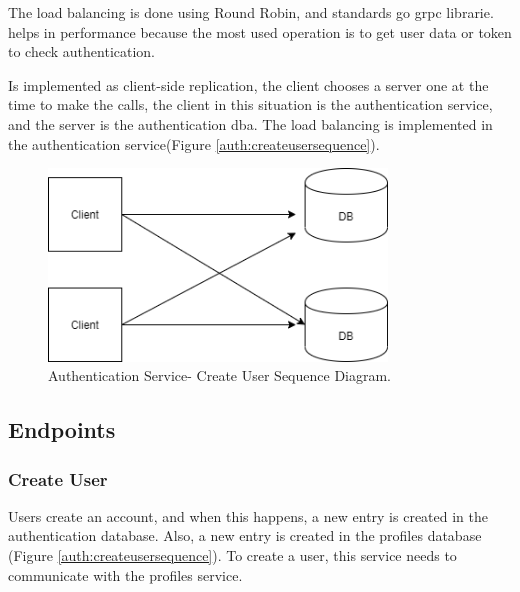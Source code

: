 The load balancing is done using Round Robin, and standards go grpc librarie. helps in performance because the most used operation is to get user data or token to check authentication.

Is implemented as client-side replication, the client chooses a server one at the time to make the calls, the client in this situation is the authentication service, and the server is the authentication dba. The load balancing is implemented in the authentication service(Figure \ref{auth:createusersequence}).

\begin{figure}[h]
	\begin{center}
		\includegraphics[width=90mm,scale=1]{img/auth/client-side-load-balancer.png}
		\caption{Authentication Service- Create User Sequence Diagram.}
		\label{auth:loadbalancerdiagram}
	\end{center}
\end{figure}

\subsection{Endpoints} 

\subsubsection{Create User}

\indent
\indent
Users create an account, and when this happens, a new entry is created in the authentication database. Also, a new entry is created in the profiles database (Figure   \ref{auth:createusersequence}). To create a user, this service needs to communicate with the profiles service.



